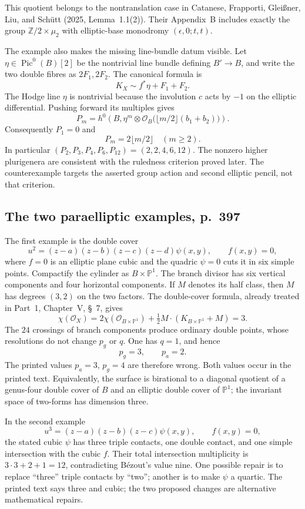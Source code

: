 This quotient belongs to the nontranslation case in Catanese, Frapporti, Glei\ss ner, Liu, and Sch\"utt (2025, Lemma~1.1(2)). Their Appendix~B includes exactly the group $\mathbb Z/2\times\mu_2$ with elliptic-base monodromy $(\epsilon,0;t,t)$.

The example also makes the missing line-bundle datum visible. Let $\eta\in\operatorname{Pic}^0(B)[2]$ be the nontrivial line bundle defining $B'\to B$, and write the two double fibres as $2F_1,2F_2$. The canonical formula is
\[
 K_X\sim f^*\eta+F_1+F_2.
\]
The Hodge line $\eta$ is nontrivial because the involution $c$ acts by $-1$ on the elliptic differential. Pushing forward its multiples gives
\[
 P_m=h^0\!\left(B,\eta^m\otimes
 \mathcal O_B\bigl(\lfloor m/2\rfloor(b_1+b_2)\bigr)\right).
\]
Consequently $P_1=0$ and
\[
 P_m=2\lfloor m/2\rfloor\quad(m\geq2).
\]
In particular $(P_2,P_3,P_4,P_6,P_{12})=(2,2,4,6,12)$. The nonzero higher plurigenera are consistent with the ruledness criterion proved later. The counterexample targets the asserted group action and second elliptic pencil, not that criterion.

\subsection{The two paraelliptic examples, p.~397}

The first example is the double cover
\[
 u^2=(z-a)(z-b)(z-c)(z-d)\psi(x,y),\qquad f(x,y)=0,
\]
where $f=0$ is an elliptic plane cubic and the quadric $\psi=0$ cuts it in six simple points. Compactify the cylinder as $B\times\mathbb P^1$. The branch divisor has six vertical components and four horizontal components. If $M$ denotes its half class, then $M$ has degrees $(3,2)$ on the two factors. The double-cover formula, already treated in Part~1, Chapter~V, \S~7, gives
\[
 \chi(\mathcal O_X)=2\chi(\mathcal O_{B\times\mathbb P^1})
 +\tfrac12 M\cdot(K_{B\times\mathbb P^1}+M)=3.
\]
The $24$ crossings of branch components produce ordinary double points, whose resolutions do not change $p_g$ or $q$. One has $q=1$, and hence
\[
 p_g=3,\qquad p_a=2.
\]
The printed values $p_a=3$, $p_g=4$ are therefore wrong. Both values occur in the printed text. Equivalently, the surface is birational to a diagonal quotient of a genus-four double cover of $B$ and an elliptic double cover of $\mathbb P^1$; the invariant space of two-forms has dimension three.

In the second example
\[
 u^3=(z-a)(z-b)(z-c)\psi(x,y),\qquad f(x,y)=0,
\]
the stated cubic $\psi$ has three triple contacts, one double contact, and one simple intersection with the cubic $f$. Their total intersection multiplicity is $3\cdot3+2+1=12$, contradicting B\'ezout's value nine. One possible repair is to replace ``three'' triple contacts by ``two''; another is to make $\psi$ a quartic. The printed text says three and cubic; the two proposed changes are alternative mathematical repairs.

